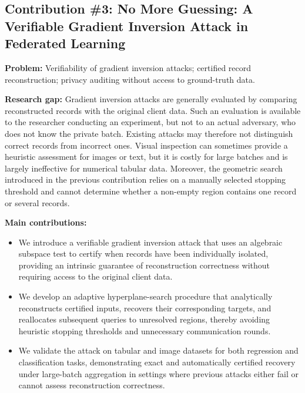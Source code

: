 \subsection*{Contribution \#3: No More Guessing: A Verifiable Gradient
Inversion Attack in Federated Learning}

\noindent\textbf{Problem:}
Verifiability of gradient inversion attacks; certified record reconstruction;
privacy auditing without access to ground-truth data.

\medskip
\noindent\textbf{Research gap:}
Gradient inversion attacks are generally evaluated by comparing reconstructed
records with the original client data. Such an evaluation is available to the
researcher conducting an experiment, but not to an actual adversary, who does
not know the private batch. Existing attacks may therefore not distinguish
correct records from incorrect ones. Visual inspection can sometimes provide a
heuristic assessment for images or text, but it is costly for large batches and
is largely ineffective for numerical tabular data. Moreover, the geometric
search introduced in the previous contribution relies on a manually selected
stopping threshold and cannot determine whether a non-empty region contains one
record or several records.

\medskip
\noindent\textbf{Main contributions:}
\begin{itemize}
    \item We introduce a verifiable gradient inversion attack that uses an
    algebraic subspace test to certify when records have been individually
    isolated, providing an intrinsic guarantee of reconstruction correctness
    without requiring access to the original client data.

    \item We develop an adaptive hyperplane-search procedure that analytically
    reconstructs certified inputs, recovers their corresponding targets, and
    reallocates subsequent queries to unresolved regions, thereby avoiding
    heuristic stopping thresholds and unnecessary communication rounds.

    \item We validate the attack on tabular and image datasets for both
    regression and classification tasks, demonstrating exact and automatically
    certified recovery under large-batch aggregation in settings where previous
    attacks either fail or cannot assess reconstruction correctness.
\end{itemize}

